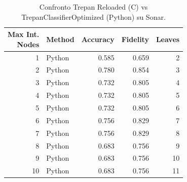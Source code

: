 \begin{table}[ht]
\centering
\footnotesize
\begin{tabular}{r l r r r}
\toprule
\makecell{Max Int.\\Nodes} & Method & Accuracy & Fidelity & Leaves \\
\midrule
1 & Python       & 0.585 & 0.659 & 2 \\
\midrule
2 & Python       & 0.780 & 0.854 & 3 \\
\midrule
3 & Python       & 0.732 & 0.805 & 4 \\
\midrule
4 & Python       & 0.732 & 0.805 & 5 \\
\midrule
5 & Python       & 0.732 & 0.805 & 6 \\
\midrule
6 & Python       & 0.756 & 0.829 & 7 \\
\midrule
7 & Python       & 0.756 & 0.829 & 8 \\
\midrule
8 & Python       & 0.683 & 0.756 & 9 \\
\midrule
9 & Python       & 0.683 & 0.756 & 10 \\
\midrule
10 & Python       & 0.683 & 0.756 & 11 \\
\bottomrule
\end{tabular}
\caption{Confronto Trepan Reloaded (C) vs TrepanClassifierOptimized (Python) su Sonar.}
\label{tab:c_vs_sonar_heart}
\end{table}